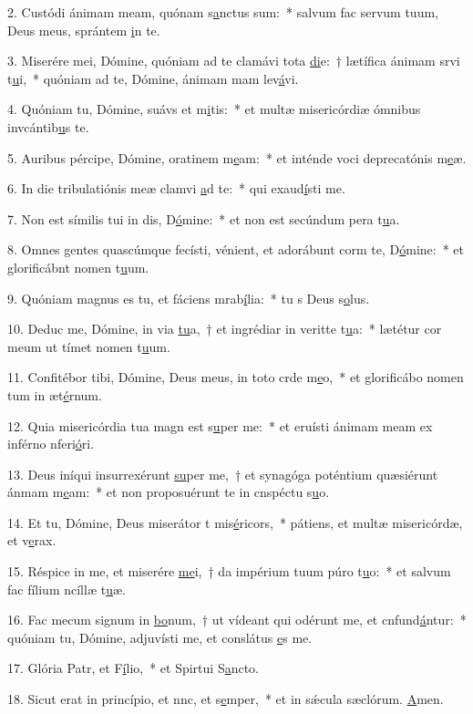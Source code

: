2. Custódi ánimam meam, quónam s\uline{a}nctus sum:~* salvum fac servum tuum, Deus meus, sprántem \uline{i}n te.\par 
3. Miserére mei, Dómine, quóniam ad te clamávi tota \uline{di}e:~† lætífica ánimam srvi t\uline{u}i,~* quóniam ad te, Dómine, ánimam mam lev\uline{á}vi.\par 
4. Quóniam tu, Dómine, suávs et m\uline{i}tis:~* et multæ misericórdiæ ómnibus invcántib\uline{u}s te.\par 
5. Auribus pércipe, Dómine, oratinem m\uline{e}am:~* et inténde voci deprecatónis m\uline{e}æ.\par 
6. In die tribulatiónis meæ clamvi \uline{a}d te:~* qui exaud\uline{í}sti me.\par 
7. Non est símilis tui in dis, D\uline{ó}mine:~* et non est secúndum pera t\uline{u}a.\par 
8. Omnes gentes quascúmque fecísti, vénient, et adorábunt corm te, D\uline{ó}mine:~* et glorificábnt nomen t\uline{u}um.\par 
9. Quóniam magnus es tu, et fáciens mrab\uline{í}lia:~* tu s Deus s\uline{o}lus.\par 
10. Deduc me, Dómine, in via \uline{tu}a,~† et ingrédiar in veritte t\uline{u}a:~* lætétur cor meum ut tímet nomen t\uline{u}um.\par 
11. Confitébor tibi, Dómine, Deus meus, in toto crde m\uline{e}o,~* et glorificábo nomen tum in æt\uline{é}rnum.\par 
12. Quia misericórdia tua magn est s\uline{u}per me:~* et eruísti ánimam meam ex inférno nferi\uline{ó}ri.\par 
13. Deus iníqui insurrexérunt \uline{su}per me,~† et synagóga poténtium quæsiérunt ánmam m\uline{e}am:~* et non proposuérunt te in cnspéctu s\uline{u}o.\par 
14. Et tu, Dómine, Deus miserátor t mis\uline{é}ricors,~* pátiens, et multæ misericórdæ, et v\uline{e}rax.\par 
15. Réspice in me, et miserére \uline{me}i,~† da impérium tuum púro t\uline{u}o:~* et salvum fac fílium ncíllæ t\uline{u}æ.\par 
16. Fac mecum signum in \uline{bo}num,~† ut vídeant qui odérunt me, et cnfund\uline{á}ntur:~* quóniam tu, Dómine, adjuvísti me, et conslátus \uline{e}s me.\par 
17. Glória Patr, et F\uline{í}lio,~* et Spirtui S\uline{a}ncto.\par 
18. Sicut erat in princípio, et nnc, et s\uline{e}mper,~* et in sǽcula sæclórum. \uline{A}men.\par 

